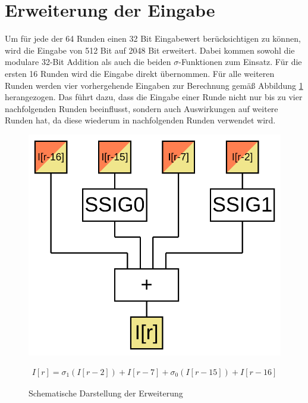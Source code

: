 \section{Erweiterung der Eingabe}
\label{sec:sha256:erweiterung}

Um für jede der 64 Runden einen 32 Bit Eingabewert berücksichtigen zu können, wird die Eingabe von 512 Bit auf 2048 Bit erweitert.
Dabei kommen sowohl die modulare 32-Bit Addition als auch die beiden $\sigma$-Funktionen zum Einsatz.
Für die ersten 16 Runden wird die Eingabe direkt übernommen. Für alle weiteren Runden werden vier vorhergehende Eingaben zur Berechnung
gemäß Abbildung \ref{fig:sha256prep} herangezogen. Das führt dazu, dass die Eingabe einer Runde nicht nur bis zu vier nachfolgenden
Runden beeinflusst, sondern auch Auswirkungen auf weitere Runden hat, da diese wiederum in nachfolgenden Runden verwendet wird.

\begin{figure}[!h]
  \centering
  \begin{minipage}[c]{5cm}
    \includegraphics[scale=0.4]{images/sha256prepS}
  \end{minipage}
  \begin{minipage}[c]{6cm}
    \begin{align}
      I[r] = \sigma_1(I[r-2]) + I[r-7] + \sigma_0(I[r-15]) + I[r-16] \nonumber
    \end{align}
  \end{minipage}
  \caption{Schematische Darstellung der Erweiterung}
  \label{fig:sha256prep}
\end{figure}